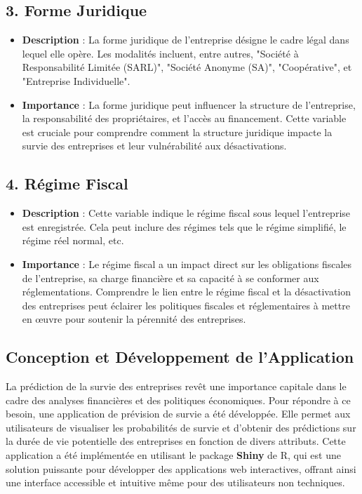 \documentclass[a4paper,12pt]{report}
\begin{document}
\subsection{3. Forme Juridique}
\begin{itemize}
    \item \textbf{Description} : La forme juridique de l'entreprise désigne le cadre légal dans lequel elle opère. Les modalités incluent, entre autres, "Société à Responsabilité Limitée (SARL)", "Société Anonyme (SA)", "Coopérative", et "Entreprise Individuelle".
    \item \textbf{Importance} : La forme juridique peut influencer la structure de l'entreprise, la responsabilité des propriétaires, et l'accès au financement. Cette variable est cruciale pour comprendre comment la structure juridique impacte la survie des entreprises et leur vulnérabilité aux désactivations.
\end{itemize}

\subsection{4. Régime Fiscal}
\begin{itemize}
    \item \textbf{Description} : Cette variable indique le régime fiscal sous lequel l'entreprise est enregistrée. Cela peut inclure des régimes tels que le régime simplifié, le régime réel normal, etc.
    \item \textbf{Importance} : Le régime fiscal a un impact direct sur les obligations fiscales de l'entreprise, sa charge financière et sa capacité à se conformer aux réglementations. Comprendre le lien entre le régime fiscal et la désactivation des entreprises peut éclairer les politiques fiscales et réglementaires à mettre en œuvre pour soutenir la pérennité des entreprises.
\end{itemize}

\subsection{Conception et Développement de l'Application}

La prédiction de la survie des entreprises revêt une importance capitale dans le cadre des analyses financières et des politiques économiques. Pour répondre à ce besoin, une application de prévision de survie a été développée. Elle permet aux utilisateurs de visualiser les probabilités de survie et d'obtenir des prédictions sur la durée de vie potentielle des entreprises en fonction de divers attributs. Cette application a été implémentée en utilisant le package \textbf{Shiny} de R, qui est une solution puissante pour développer des applications web interactives, offrant ainsi une interface accessible et intuitive même pour des utilisateurs non techniques.
\end{document}
